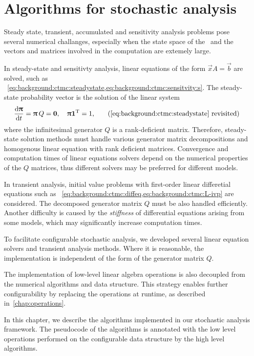 \chapter{Algorithms for stochastic analysis}
\label{chap:algorithms}

Steady state, transient, accumulated and sensitivity analysis problems
pose several numerical challanges, especially when the state space of
the \CTMC\ and the vectors and matrices involved in the computation are
extemely large.

In steady-state and sensitivty analysis, linear equations of the form
$\vec{x} A = \vec{b}$ are solved, such as%
~\vref{eq:background:ctmc:steadystate,eq:background:ctmc:sensitvity:s}. The
steady-state probability vector is the solution of the linear system
\begin{equation}
  \frac{\dd \vec{\uppi}}{\dd t} = \vec{\uppi} \, Q = \vec{0},
  \quad \vec{\uppi} \vec{1}^\T = 1 \text,
  \tag{\ref{eq:background:ctmc:steadystate}~revisited}
\end{equation}
where the infinitesimal generator $Q$ is a rank-deficient
matrix. Therefore, steady-state solution methods must handle various
generator matrix decompositions and homogenous linear equation with
rank deficient matrices. Convergence and computation times of linear
equations solvers depend on the numerical properties of the $Q$
matrices, thus different solvers may be preferred for different
models.

In transient analysis, initial value problems with first-order linear
differetial equations such as%
~\vref{eq:background:ctmc:diffeq,eq:background:ctmc:L-ivp} are
considered. The decomposed generator matrix $Q$ must be also handled
efficiently. Another difficulty is caused by the \emph{stiffness} of
differential equations arising from some models, which may
significantly increase computation times.

To facilitate configurable stochastic analysis, we developed several
linear equation solvers and transient analysis methods. Where it is
reasonable, the implementation is independent of the form of the
generator matrix $Q$.

The implementation of low-level linear algebra operations is also
decoupled from the numerical algorithms and data structure. This
strategy enables further configurability by replacing the operations
at runtime, as described in~\cref{chap:operations}.

In this chapter, we describe the algorithms implemented in our
stochastic analysis framework. The pseudocode of the algorithms is
annotated with the low level operations performed on the configurable
data structure by the high level algorithms.

